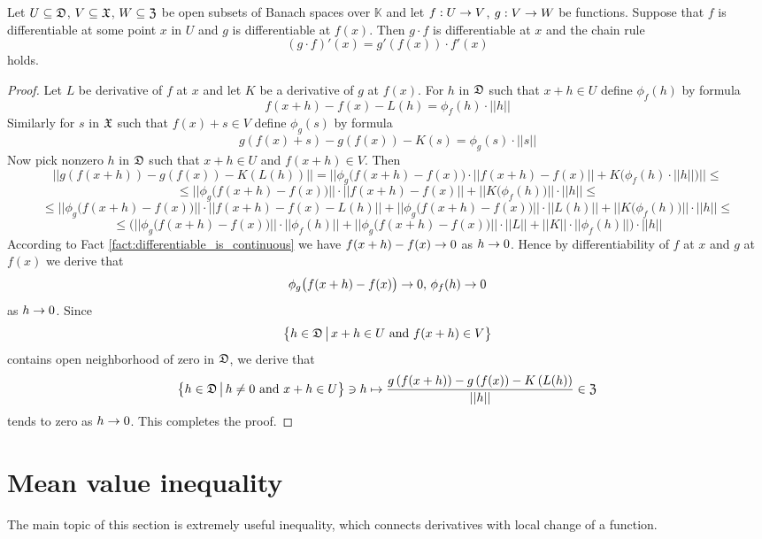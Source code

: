 \begin{theorem}\label{theorem:chain_rule_for_differentiable}
Let $U\subseteq {\mathfrak D}$, $V\subseteq {\mathfrak X}$, $W\subseteq {\mathfrak Z}$ be open subsets of Banach spaces over $\mathbb{K}$ and let $f:U\rightarrow V$, $g:V\rightarrow W$ be functions. Suppose that $f$ is differentiable at some point $x$ in $U$ and $g$ is differentiable at $f(x)$. Then $g\cdot f$ is differentiable at $x$ and the chain rule
$$\left(g\cdot f\right)'(x) = g'\left(f(x)\right)\cdot f'(x)$$
holds.
\end{theorem}
\begin{proof}
Let $L$ be derivative of $f$ at $x$ and let $K$ be a derivative of $g$ at $f(x)$. For $h$ in ${\mathfrak D}$ such that $x+h\in U$ define $\phi_f(h)$ by formula
$$f(x + h) - f(x) - L(h) = \phi_f(h)\cdot ||h||$$
Similarly for $s$ in ${\mathfrak X}$ such that $f(x) + s \in V$ define $\phi_g(s)$ by formula
$$g(f(x) + s) - g(f(x)) - K(s) = \phi_g(s)\cdot ||s||$$
Now pick nonzero $h$ in ${\mathfrak D}$ such that $x+h \in U$ and $f(x + h) \in V$. Then
$$\big|\big|g\left(f(x+h)\right)- g\left(f(x)\right) - K\left(L(h)\right)\big|\big| = \bigg|\bigg|\phi_g\big(f(x+h) - f(x)\big)\cdot ||f(x+h) - f(x)|| + K\big(\phi_f(h)\cdot ||h||\big)\bigg|\bigg| \leq$$
$$\leq \big|\big|\phi_g\big(f(x+h) - f(x)\big)\big|\big| \cdot ||f(x+h) - f(x)|| + \big|\big| K\big(\phi_f(h)\big)\big|\big|\cdot ||h|| \leq$$
$$\leq \big|\big|\phi_g\big(f(x+h) - f(x)\big)\big|\big| \cdot ||f(x+h) - f(x) - L(h)|| + \big|\big|\phi_g\big(f(x+h) - f(x)\big)\big|\big|\cdot ||L(h)|| + \big|\big| K\big(\phi_f(h)\big)\big|\big|\cdot ||h|| \leq $$
$$\leq \bigg(\big|\big|\phi_g\big(f(x+h) - f(x)\big)\big|\big| \cdot ||\phi_f(h)|| + \big|\big|\phi_g\big(f(x+h) - f(x)\big)\big|\big|\cdot ||L|| + ||K||\cdot ||\phi_f(h)||\bigg)\cdot ||h||$$
According to Fact \ref{fact:differentiable_is_continuous} we have $f(x+h) - f(x) \rightarrow 0$ as $h\rightarrow 0$. Hence by differentiability of $f$ at $x$ and $g$ at $f(x)$ we derive that
$$\phi_g\big(f(x+h) - f(x)\big)\rightarrow 0,\,\phi_f(h)\rightarrow 0$$
as $h\rightarrow 0$. Since
$$\big\{h\in {\mathfrak D}\,\big|\,x+h\in U\mbox{ and }f(x+h)\in V\big\}$$
contains open neighborhood of zero in ${\mathfrak D}$, we derive that
$$\big\{h\in {\mathfrak D}\,\big|\,h\neq 0\mbox{ and }x+h\in U\big\} \ni h \mapsto \frac{g\left(f(x+h)\right)- g\left(f(x)\right) - K\left(L(h)\right)}{||h||} \in {\mathfrak Z}$$
tends to zero as $h\rightarrow 0$. This completes the proof.
\end{proof}

\section{Mean value inequality}
\noindent
The main topic of this section is extremely useful inequality, which connects derivatives with local change of a function.

